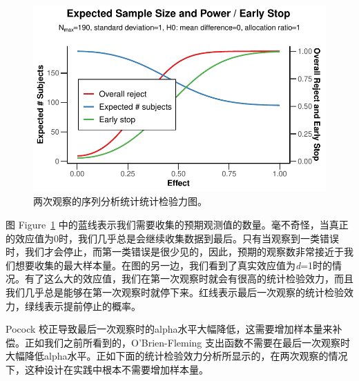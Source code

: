 \documentclass[
  letterpaper,
  DIV=11,
  numbers=noendperiod]{scrreprt}
\begin{document}
\begin{figure}[H]

{\centering \includegraphics[width=1\textwidth,height=\textheight]{10-sequential_files/figure-pdf/fig-powerseq-1.pdf}

}

\caption{\label{fig-powerseq}两次观察的序列分析统计统计检验力图。}

\end{figure}

图 Figure~\ref{fig-powerseq}
中的蓝线表示我们需要收集的预期观测值的数量。毫不奇怪，当真正的效应值为0时，我们几乎总是会继续收集数据到最后。只有当观察到一类错误时，我们才会停止，而第一类错误是很少见的，因此，预期的观察数非常接近于我们想要收集的最大样本量。在图的另一边，我们看到了真实效应值为\emph{d}=1时的情况。有了这么大的效应值，我们在第一次观察时就会有很高的统计检验效力，而且我们几乎总是能够在第一次观察时就停下来。红线表示最后一次观察的统计检验效力，绿线表示提前停止的概率。

Pocock
校正导致最后一次观察时的alpha水平大幅降低，这需要增加样本量来补偿。正如我们之前所看到的，O'Brien-Fleming
支出函数不需要在最后一次观察时大幅降低alpha水平。正如下面的统计检验效力分析所显示的，在两次观察的情况下，这种设计在实践中根本不需要增加样本量。
\end{document}
